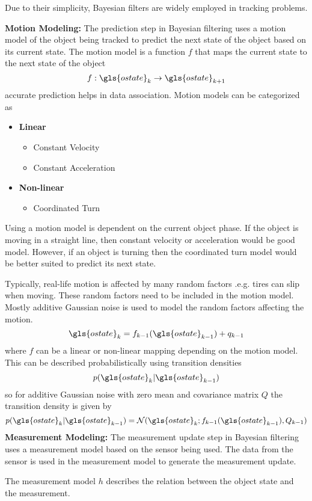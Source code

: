 \documentclass[a4paper]{article}
\begin{document}
Due to their simplicity, Bayesian filters are widely employed in tracking problems.\par
\textbf{Motion Modeling: }The prediction step in Bayesian filtering uses a motion model of the object being tracked to predict the next state of the object based on its current state. The motion model is a function $f$ that maps the current state to the next state of the object
$$f:\gls{ostate}_k \to \gls{ostate}_{k+1}$$
accurate prediction helps in data association. Motion models can be categorized as
\begin{itemize}
	\item \textbf{Linear}
	\begin{itemize}
		\item Constant Velocity
		\item Constant Acceleration
	\end{itemize}
	\item \textbf{Non-linear}
	\begin{itemize}
		\item Coordinated Turn
	\end{itemize}
\end{itemize}
Using a motion model is dependent on the current object phase. If the object is moving in a straight line, then constant velocity or acceleration would be good model. However, if an object is turning then the coordinated turn model would be better suited to predict its next state.\par
Typically, real-life motion is affected by many random factors .e.g. tires can slip when moving. These random factors need to be included in the motion model. Mostly additive Gaussian noise is used to model the random factors affecting the motion.
$$\gls{ostate}_k = f_{k-1}(\gls{ostate}_{k-1})+q_{k-1}$$
where $f$ can be a linear or non-linear mapping depending on the motion model. This can be described probabilistically using transition densities
$$p(\gls{ostate}_k | \gls{ostate}_{k-1})$$
so for additive Gaussian noise with zero mean and covariance matrix $Q$ the transition density is given by
$$p(\gls{ostate}_k | \gls{ostate}_{k-1})=\mathcal{N}(\gls{ostate}_k;f_{k-1}(\gls{ostate}_{k-1}), Q_{k-1})$$
\textbf{Measurement Modeling: }The measurement update step in Bayesian filtering uses a measurement model based on the sensor being used. The data from the sensor is used in the measurement model to generate the measurement update.\par
The measurement model $h$ describes the relation between the object state and the measurement.
\end{document}
